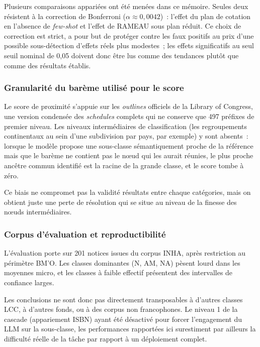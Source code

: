Plusieurs comparaisons appariées ont été menées dans ce mémoire. Seules deux résistent à la correction de Bonferroni ($\alpha \approx 0{,}0042$)~: l'effet du plan de cotation en l'absence de \textit{few-shot} et l'effet de RAMEAU sous plan réduit. Ce choix de correction est strict, a pour but de protéger contre les faux positifs au prix d'une possible sous-détection d'effets réels plus modestes~; les effets significatifs au seul seuil nominal de 0,05 doivent donc être lus comme des tendances plutôt que comme des résultats établis.

\subsubsection*{Granularité du barème utilisé pour le score}

Le score de proximité s'appuie sur les \textit{outlines} officiels de la Library of Congress, une version condensée des \textit{schedules} complets qui ne conserve que 497 préfixes de premier niveau. Les niveaux intermédiaires de classification (les regroupements continentaux au sein d'une subdivision par pays, par exemple) y sont absents~: lorsque le modèle propose une sous-classe sémantiquement proche de la référence mais que le barème ne contient pas le nœud qui les aurait réunies, le plus proche ancêtre commun identifié est la racine de la grande classe, et le score tombe à zéro. 

Ce biais ne compromet pas la validité résultats entre chaque catégories, mais on obtient juste une perte de résolution qui se situe au niveau de la finesse des nœuds intermédiaires.

\subsubsection*{Corpus d'évaluation et reproductibilité}

L'évaluation porte sur 201 notices issues du corpus INHA, après restriction au périmètre BM'O. Les classes dominantes (N, AM, NA) pèsent lourd dans les moyennes micro, et les classes à faible effectif présentent des intervalles de confiance larges. 

Les conclusions ne sont donc pas directement transposables à d'autres classes LCC, à d'autres fonds, ou à des corpus non francophones. Le niveau 1 de la cascade (appariement ISBN) ayant été désactivé pour forcer l'engagement du LLM sur la sous-classe, les performances rapportées ici surestiment par ailleurs la difficulté réelle de la tâche par rapport à un déploiement complet.


